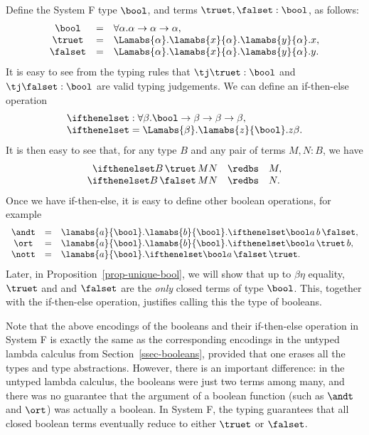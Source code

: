 \documentclass[12pt]{article}
\begin{document}
Define the System F type $\bool$, and terms $\truet,\falset:\bool$, as follows:
\[ \begin{array}{ccl}
  \bool &=& \forall\alpha.\alpha\to\alpha\to\alpha,\\
  \truet &=& \Lamabs{\alpha}.\lamabs{x}{\alpha}.\lamabs{y}{\alpha}.x,\\
  \falset &=& \Lamabs{\alpha}.\lamabs{x}{\alpha}.\lamabs{y}{\alpha}.y.\\
\end{array}
\]
It is easy to see from the typing rules that $\tj\truet:\bool$ and
$\tj\falset:\bool$ are valid typing judgements. We can define an
if-then-else operation 
\[ \begin{array}{l}
  \ifthenelset : \forall\beta.\bool\to\beta\to\beta\to\beta,
  \\  \ifthenelset = \Lamabs{\beta}.\lamabs{z}{\bool}.z\beta.
\end{array}
\]
It is then easy to see that, for any type $B$ and any pair of terms
$M,N:B$, we have
\[ \begin{array}{rcl}
  \ifthenelset B\, \truet\, MN &\redbs& M,\\
  \ifthenelset B\, \falset\, MN &\redbs& N.
\end{array}
\]
Once we have if-then-else, it is easy to define other boolean
operations, for example
\[ \begin{array}{ccl}
  \andt &=& \lamabs{a}{\bool}.\lamabs{b}{\bool}.\ifthenelset\bool a\,b\,\falset,\\
  \ort &=& \lamabs{a}{\bool}.\lamabs{b}{\bool}.\ifthenelset\bool a\,\truet\,b,\\
  \nott &=& \lamabs{a}{\bool}.\ifthenelset\bool a\,\falset\,\truet.
\end{array}
\]
Later, in Proposition~\ref{prop-unique-bool}, we will show that up to
$\beta\eta$ equality, $\truet$ and and $\falset$ are the {\em only}
closed terms of type $\bool$. This, together with the if-then-else
operation, justifies calling this the type of booleans.

Note that the above encodings of the booleans and their if-then-else
operation in System F is exactly the same as the corresponding
encodings in the untyped lambda calculus from
Section~\ref{ssec-booleans}, provided that one erases all the types
and type abstractions. However, there is an important difference: in
the untyped lambda calculus, the booleans were just two terms among
many, and there was no guarantee that the argument of a boolean
function (such as $\andt$ and $\ort$) was actually a boolean. In
System F, the typing guarantees that all closed boolean terms
eventually reduce to either $\truet$ or $\falset$. 
\end{document}
